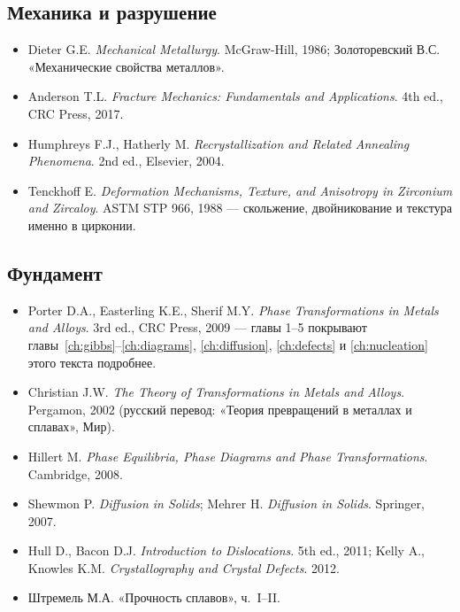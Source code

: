 \subsection*{Механика и разрушение}
\begin{itemize}
\item Dieter G.E. \emph{Mechanical Metallurgy}. McGraw-Hill, 1986; Золоторевский В.С. «Механические свойства металлов».
\item Anderson T.L. \emph{Fracture Mechanics: Fundamentals and Applications}. 4th ed., CRC Press, 2017.
\item Humphreys F.J., Hatherly M. \emph{Recrystallization and Related Annealing Phenomena}. 2nd ed., Elsevier, 2004.
\item Tenckhoff E. \emph{Deformation Mechanisms, Texture, and Anisotropy in Zirconium and Zircaloy}. ASTM STP 966, 1988 ---
  скольжение, двойникование и текстура именно в цирконии.
\end{itemize}

\subsection*{Фундамент}
\begin{itemize}
\item Porter D.A., Easterling K.E., Sherif M.Y. \emph{Phase Transformations in Metals and Alloys}. 3rd ed., CRC Press, 2009 ---
  главы 1--5 покрывают главы~\ref{ch:gibbs}--\ref{ch:diagrams}, \ref{ch:diffusion}, \ref{ch:defects} и \ref{ch:nucleation} этого текста подробнее.
\item Christian J.W. \emph{The Theory of Transformations in Metals and Alloys}. Pergamon, 2002 (русский перевод: «Теория
  превращений в металлах и сплавах», Мир).
\item Hillert M. \emph{Phase Equilibria, Phase Diagrams and Phase Transformations}. Cambridge, 2008.
\item Shewmon P. \emph{Diffusion in Solids}; Mehrer H. \emph{Diffusion in Solids}. Springer, 2007.
\item Hull D., Bacon D.J. \emph{Introduction to Dislocations}. 5th ed., 2011; Kelly A., Knowles K.M.
  \emph{Crystallography and Crystal Defects}. 2012.
\item Штремель М.А. «Прочность сплавов», ч.~I--II.
\end{itemize}

